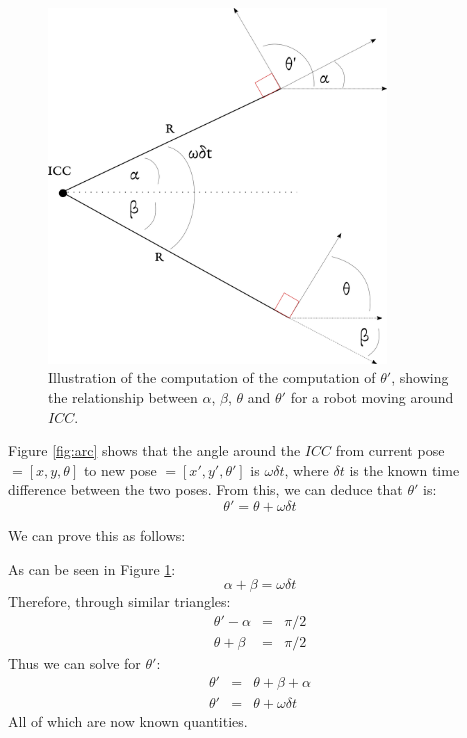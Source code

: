 \documentclass[11pt]{article}
\begin{document}
\begin{figure}
    \centering
    \includegraphics[width=0.8\textwidth]{images/theta-proof}
    \caption{Illustration of the computation of the computation of $\theta'$, showing the relationship between 
    $\alpha$, $\beta$, $\theta$ and $\theta'$ for a robot moving around $ICC$.}
    \label{fig:theta-proof}
\end{figure}

Figure \ref{fig:arc} shows that the angle around the $ICC$ from current pose $ = [x,y,\theta]$ to new pose $ = [x',y',\theta']$ is 
$\omega\delta t$, where $\delta t$ is the known time difference between the two poses. From this, we can deduce that
$\theta'$ is:
\begin{equation}
    \theta' = \theta + \omega\delta t \label{eqn:theta}
\end{equation}

We can prove this as follows:

As can be seen in Figure \ref{fig:theta-proof}: 
\begin{equation}
    \alpha + \beta = \omega\delta t
\end{equation}
Therefore, through similar triangles:
\begin{eqnarray}
    \theta' - \alpha &=& \pi/2 \nonumber\\   
    \theta + \beta &=& \pi/2 
\end{eqnarray}
Thus we can solve for $\theta'$:
\begin{eqnarray}
\theta' &=& \theta + \beta + \alpha \nonumber\\
\theta' &=& \theta + \omega\delta t
\end{eqnarray}
All of which are now known quantities.
\end{document}
